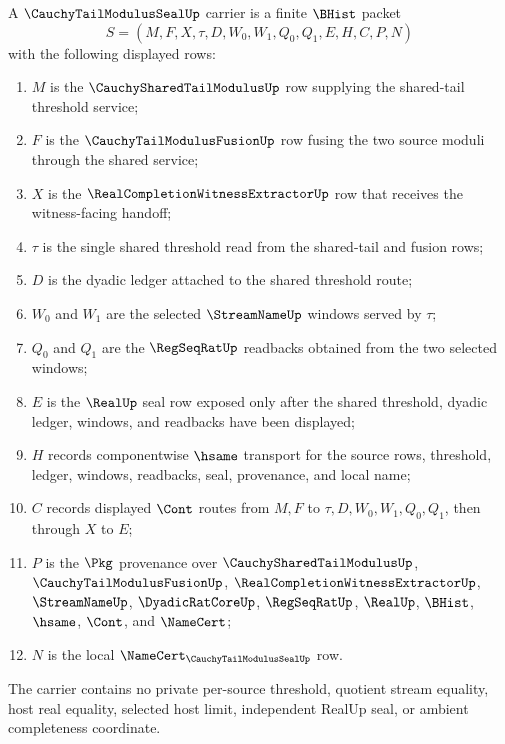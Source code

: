 \begin{definition}
\label{def:cauchy-tail-modulus-seal-carrier}
A $\CauchyTailModulusSealUp$ carrier is a finite $\BHist$ packet
$$
S=(M,F,X,\tau,D,W_0,W_1,Q_0,Q_1,E,H,C,P,N)
$$
with the following displayed rows:
\begin{enumerate}
\item $M$ is the $\CauchySharedTailModulusUp$ row supplying the shared-tail threshold service;
\item $F$ is the $\CauchyTailModulusFusionUp$ row fusing the two source moduli through the shared service;
\item $X$ is the $\RealCompletionWitnessExtractorUp$ row that receives the witness-facing handoff;
\item $\tau$ is the single shared threshold read from the shared-tail and fusion rows;
\item $D$ is the dyadic ledger attached to the shared threshold route;
\item $W_0$ and $W_1$ are the selected $\StreamNameUp$ windows served by $\tau$;
\item $Q_0$ and $Q_1$ are the $\RegSeqRatUp$ readbacks obtained from the two selected windows;
\item $E$ is the $\RealUp$ seal row exposed only after the shared threshold, dyadic ledger, windows, and readbacks have been displayed;
\item $H$ records componentwise $\hsame$ transport for the source rows, threshold, ledger, windows, readbacks, seal, provenance, and local name;
\item $C$ records displayed $\Cont$ routes from $M,F$ to $\tau,D,W_0,W_1,Q_0,Q_1$, then through $X$ to $E$;
\item $P$ is the $\Pkg$ provenance over $\CauchySharedTailModulusUp$, $\CauchyTailModulusFusionUp$, $\RealCompletionWitnessExtractorUp$, $\StreamNameUp$, $\DyadicRatCoreUp$, $\RegSeqRatUp$, $\RealUp$, $\BHist$, $\hsame$, $\Cont$, and $\NameCert$;
\item $N$ is the local $\NameCert_{\CauchyTailModulusSealUp}$ row.
\end{enumerate}
The carrier contains no private per-source threshold, quotient stream equality, host real equality, selected host limit, independent RealUp seal, or ambient completeness coordinate.
\end{definition}

